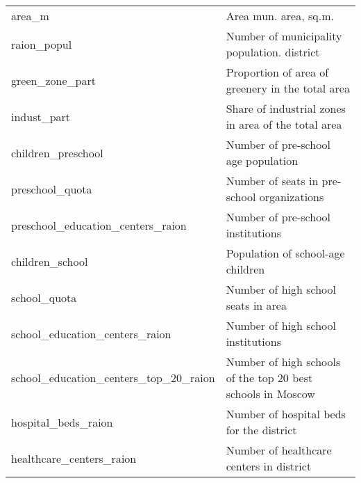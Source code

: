 \begin{longtable}[c]{ll}
    area\_m                                    & Area mun. area, sq.m.                                                                                                     \\
    raion\_popul                               & Number of municipality population. district                                                                               \\
    green\_zone\_part                          & Proportion of area of ​​greenery in the total area                                                                        \\
    indust\_part                               & Share of industrial zones in area of ​​the total area                                                                     \\
    children\_preschool                        & Number of pre-school age population                                                                                       \\
    preschool\_quota                           & Number of seats in pre-school organizations                                                                               \\
    preschool\_education\_centers\_raion       & Number of pre-school  institutions                                                                                        \\
    children\_school                           & Population of school-age children                                                                                         \\
    school\_quota                              & Number of high school seats in area                                                                                       \\
    school\_education\_centers\_raion          & Number of  high school institutions                                                                                       \\
    school\_education\_centers\_top\_20\_raion & Number of high schools of the top 20 best schools in Moscow                                                               \\
    hospital\_beds\_raion                      & Number of hospital beds for the district                                                                                  \\
    healthcare\_centers\_raion                 & Number of healthcare centers in district                                                                                  \\

\end{longtable}
